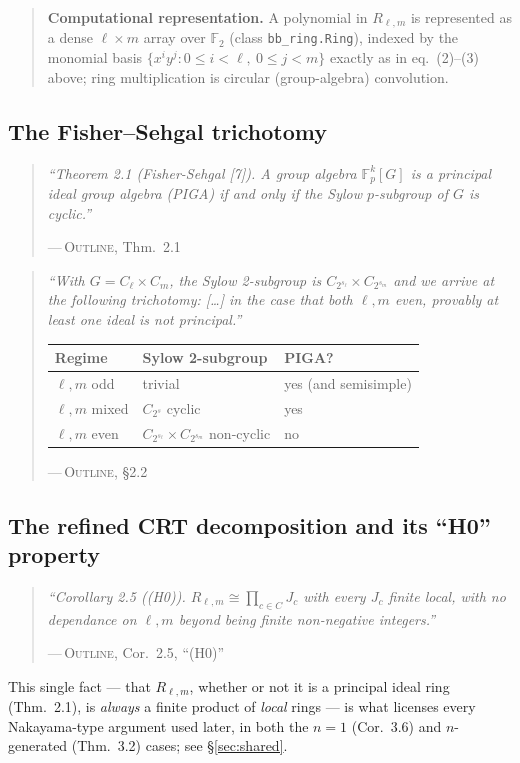 \documentclass[11pt]{article}
\theoremstyle{plain}
\theoremstyle{definition}
\newenvironment{paperquote}[1]{%
  \def\paperquotecite{#1}%
  \begin{quotation}\noindent\itshape\small
}{%
  \normalfont\par\hfill---\,\textsc{Outline}, \paperquotecite\medskip
  \end{quotation}
}
\newcommand{\pq}[2]{\begin{paperquote}{#1}#2\end{paperquote}}
\newenvironment{mynote}{%
  \begin{quotation}\noindent\small
}{%
  \end{quotation}
}
\begin{document}
\begin{mynote}
\textbf{Computational representation.} A polynomial in $R_{\ell,m}$ is
represented as a dense $\ell\times m$ array over $\mathbb{F}_2$ (class
\texttt{bb\_ring.Ring}), indexed by the monomial basis
$\{x^iy^j : 0\le i<\ell,\ 0\le j<m\}$ exactly as in eq.\ (2)--(3) above; ring
multiplication is circular (group-algebra) convolution.
\end{mynote}

\subsection{The Fisher--Sehgal trichotomy}

\pq{Thm.\ 2.1}{%
``Theorem 2.1 (Fisher-Sehgal [7]). A group algebra $\mathbb{F}_p^k[G]$ is a
principal ideal group algebra (PIGA) if and only if the Sylow $p$-subgroup
of $G$ is cyclic.''
}

\pq{\S2.2}{%
``With $G = C_\ell \times C_m$, the Sylow 2-subgroup is
$C_{2^{s_\ell}} \times C_{2^{s_m}}$ and we arrive at the following
trichotomy: [\ldots] in the case that both $\ell,m$ even, provably at least
one ideal is not principal.''
\par\smallskip
\begin{tabular}{@{}lll@{}}
\toprule
Regime & Sylow 2-subgroup & PIGA? \\
\midrule
$\ell,m$ odd   & trivial & yes (and semisimple) \\
$\ell,m$ mixed & $C_{2^s}$ cyclic & yes \\
$\ell,m$ even  & $C_{2^{s_\ell}}\times C_{2^{s_m}}$ non-cyclic & no \\
\bottomrule
\end{tabular}
}

\subsection{The refined CRT decomposition and its ``H0'' property}

\pq{Cor.\ 2.5, ``(H0)''}{%
``Corollary 2.5 ((H0)). $R_{\ell,m} \cong \prod_{c\in C} J_c$ with every
$J_c$ finite local, with no dependance on $\ell,m$ beyond being finite
non-negative integers.''
}

This single fact --- that $R_{\ell,m}$, whether or not it is a principal
ideal ring (Thm.\ 2.1), is \emph{always} a finite product of \emph{local}
rings --- is what licenses every Nakayama-type argument used later, in both
the $n=1$ (Cor.\ 3.6) and $n$-generated (Thm.\ 3.2) cases; see \S\ref{sec:shared}.
\end{document}
